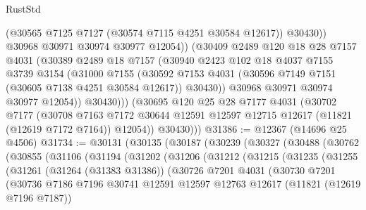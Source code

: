 \begin{lexlean}{RustStd}
\begin{coremodule}
                    (@30565 @7125 @7127 (@30574 @7115 @4251 @30584 @12617))
                    @30430))
                @30968
                @30971
                @30974
                @30977
                @12054))
            (@30409
              @2489
              @120
              @18
              @28
              @7157
              @4031
              (@30389
                @2489
                @18
                @7157
                (@30940
                  @2423
                  @102
                  @18
                  @4037
                  @7155
                  @3739
                  @3154
                  (@31000
                    @7155
                    (@30592
                      @7153
                      @4031
                      (@30596 @7149 @7151 (@30605 @7138 @4251 @30584 @12617))
                      @30430))
                  @30968
                  @30971
                  @30974
                  @30977
                  @12054))
              @30430)))
        (@30695
          @120
          @25
          @28
          @7177
          @4031
          (@30702
            @7177
            (@30708
              @7163
              @7172
              @30644
              @12591
              @12597
              @12715
              @12617
              (@11821 (@12619 @7172 @7164))
              @12054))
          @30430)))
@31386 := @12367 (@14696 @25 @4506)
@31734 := @30131
    (@30135
      (@30187
        (@30239
          (@30327
            (@30488
              (@30762
                (@30855
                  (@31106
                    (@31194
                      (@31202
                        (@31206
                          (@31212
                            (@31215
                              (@31235
                                (@31255
                                  (@31261
                                    (@31264 (@31383 @31386))
                                    (@30726
                                      @7201
                                      @4031
                                      (@30730
                                        @7201
                                        (@30736
                                          @7186
                                          @7196
                                          @30741
                                          @12591
                                          @12597
                                          @12763
                                          @12617
                                          (@11821 (@12619 @7196 @7187))

\end{coremodule}
\end{lexlean}
